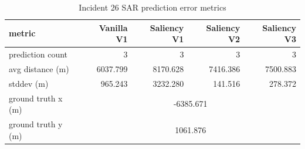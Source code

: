 \begin{table}[ht]
\centering
\caption{Incident 26 SAR prediction error metrics}
\label{tab:sar-incident-26}
\begin{tabular}{lrrrr}
\hline
metric & Vanilla V1 & Saliency V1 & Saliency V2 & Saliency V3 \\
\hline
prediction count & 3 & 3 & 3 & 3 \\
avg distance (m) & 6037.799 & 8170.628 & 7416.386 & 7500.883 \\
stddev (m) & 965.243 & 3232.280 & 141.516 & 278.372 \\
ground truth x (m) & \multicolumn{4}{c}{-6385.671} \\
ground truth y (m) & \multicolumn{4}{c}{1061.876} \\
\hline
\end{tabular}
\end{table}
